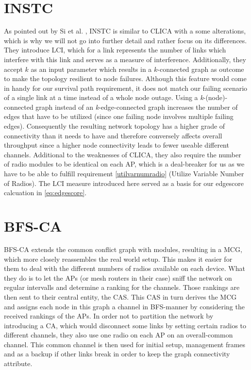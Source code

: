   \section{\ac{INSTC}}
    As pointed out by Si et al. \cite{overview_caa}, \ac{INSTC} \cite{INSTC} is similar to \ac{CLICA} with a some alterations, 
    which is why we will not go into further detail and rather focus on its differences. 
    They introduce \ac{LCI}, which for a link represents the number of links which interfere with this link \cite{overview_caa} and serves as a measure of 
    interference. Additionally, they accept \(k\) as an input parameter which results in a \(k\)-connected graph as outcome to make the topology resilient to node failures.
    Although this feature would come in handy for our survival path requirement, it does not match our failing scenario of a single link at a time instead of a whole node outage.
    Using a \textit{k}-(node)-connected graph instead of an \textit{k}-edge-connected graph increases the number of edges that have to be utilized 
    (since one failing node involves multiple failing edges). Consequently the resulting network topology has a higher grade of connectivity than it needs to 
    have and therefore conversely affects overall throughput since a higher node connectivity leads to fewer useable different channels. 
    Additional to the weaknesses of \ac{CLICA}, they also require the number of radio modules to be identical on each \ac{AP}, 
    which is a deal-breaker for us as we have to be able to fulfill requirement \ref{utilvarnumradio} (Utilize Variable Number of Radios).
    The \ac{LCI} measure introduced here served as a basis for our edgescore calcuation in \ref{eq:edgescore}.
    
  \section{\ac{BFS-CA}}
    \ac{BFS-CA} \cite{BFS-CA} extends the common conflict graph with modules, resulting in a \ac{MCG}, which more closely reassembles the
    real world setup. This makes it easier for them to deal with the different numbers of radios available on each device. 
    What they do is to let the APs (or mesh routers in their case) sniff the network on regular intervalls and determine a ranking for the channels.
    Those rankings are then sent to their central entity, the \ac{CAS}. This \ac{CAS} in turn derives the \ac{MCG} and assigns each node in this graph 
    a channel in \ac{BFS}-manner by considering the received rankings of the APs. In order not to partition the network by introducing a \ac{CA}, which 
    would disconnect some links by setting certain radios to different channels, they also use one radio on each AP on an overall-common channel.
    This common channel is then used for initial setup, management frames and as a backup if other links break in order to keep the graph connectivity attribute.
    
